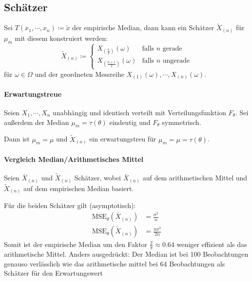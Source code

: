 \documentclass[a4paper, 11pt, accentcolor = tud3b]{tudreport}
\newcommand{\MSE}{\ensuremath{\textrm{MSE}}}
\begin{document}
            \subsection{Schätzer}
                Sei \( T(x_1, \cdots, x_n) \coloneqq \tilde{x} \) der empirische Median, dann kann ein Schätzer \( \tilde{X}_{(n)} \) für \(\mu_m\) mit diesem konstruiert werden:
                \begin{equation*}
	                \tilde{X}_{(n)} \coloneqq
	                \begin{cases}
	                	X_{(\frac{n}{2})}(\omega)     & \textrm{falls } n \textrm{ gerade}   \\
	                	X_{(\frac{n + 1}{2})}(\omega) & \textrm{falls } n \textrm{ ungerade}
	                \end{cases}
                \end{equation*}
                für \( \omega \in \Omega \) und der geordneten Messreihe \( X_{(1)}(\omega), \cdots, X_{(n)}(\omega) \).
                
                \paragraph{Erwartungstreue}
	                Seien \(X_1, \cdots, X_n\) unabhängig und identisch verteilt mit Verteilungsfunktion \( F_\theta \). Sei außerdem der Median \( \mu_m = \tau(\theta) \) eindeutig und \( F_\theta \) symmetrisch.
	                
	                Dann ist \( \mu_m = \mu \) und \( \tilde{X}_{(n)} \) ein erwartungstreu für \( \mu_m = \mu = \tau(\theta) \).
                
                \paragraph{Vergleich Median/Arithmetisches Mittel}
	                Seien \( \bar{X}_{(n)} \) und \( \tilde{X}_{(n)} \) Schätzer, wobei \( \bar{X}_{(n)} \) auf dem arithmetischen Mittel und \( \tilde{X}_{(n)} \) auf dem empirischen Median basiert.
	                
	                Für die beiden Schätzer gilt (asymptotisch):
	                \begin{align*}
	                	\MSE_\theta(\bar{X}_{(n)})   & = \frac{\sigma^2}{n}      \\
	                	\MSE_\theta(\tilde{X}_{(n)}) & = \frac{\pi \sigma^2}{2n}
	                \end{align*}
	                Somit ist der empirische Median um den Faktor \( \frac{2}{\pi} \approx 0.64 \) weniger effizient als das arithmetische Mittel. Anders ausgedrückt: Der Median ist bei 100 Beobachtungen genauso verlässlich wie das arithmetische mittel bei 64 Beobachtungen als Schätzer für den Erwartungswert
\end{document}
